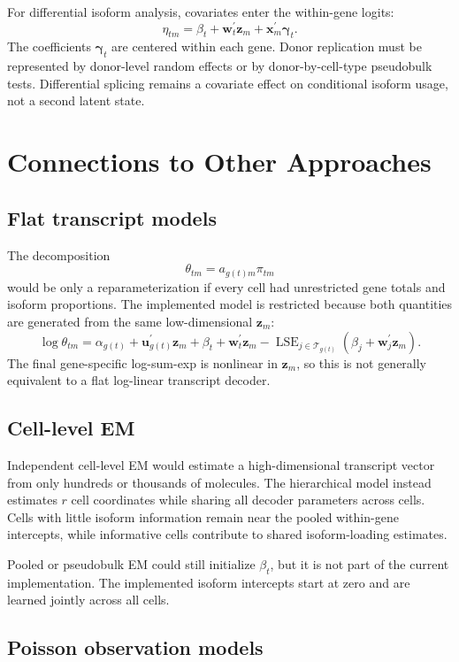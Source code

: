 \documentclass[11pt]{article}
\begin{document}
For differential isoform analysis, covariates enter the within-gene logits:
\[
  \eta_{tm}
  =
  \beta_t+\bm w_t^\prime\bm z_m+\bm x_m^\prime\bm\gamma_t.
\]
The coefficients \(\bm\gamma_t\) are centered within each gene. Donor
replication must be represented by donor-level random effects or by
donor-by-cell-type pseudobulk tests. Differential splicing remains a
covariate effect on conditional isoform usage, not a second latent state.

\section*{Connections to Other Approaches}

\subsection*{Flat transcript models}

The decomposition
\[
  \theta_{tm}=a_{g(t)m}\pi_{tm}
\]
would be only a reparameterization if every cell had unrestricted gene totals
and isoform proportions. The implemented model is restricted because both
quantities are generated from the same low-dimensional \(\bm z_m\):
\[
  \log\theta_{tm}
  =
  \alpha_{g(t)}+\bm u_{g(t)}^\prime\bm z_m
  +\beta_t+\bm w_t^\prime\bm z_m
  -\operatorname{LSE}_{j\in\mathcal T_{g(t)}}
   (\beta_j+\bm w_j^\prime\bm z_m).
\]
The final gene-specific log-sum-exp is nonlinear in \(\bm z_m\), so this is
not generally equivalent to a flat log-linear transcript decoder.

\subsection*{Cell-level EM}

Independent cell-level EM would estimate a high-dimensional transcript vector
from only hundreds or thousands of molecules. The hierarchical model instead
estimates \(r\) cell coordinates while sharing all decoder parameters across
cells. Cells with little isoform information remain near the pooled
within-gene intercepts, while informative cells contribute to shared
isoform-loading estimates.

Pooled or pseudobulk EM could still initialize \(\beta_t\), but it is not part
of the current implementation. The implemented isoform intercepts start at
zero and are learned jointly across all cells.

\subsection*{Poisson observation models}
\end{document}
